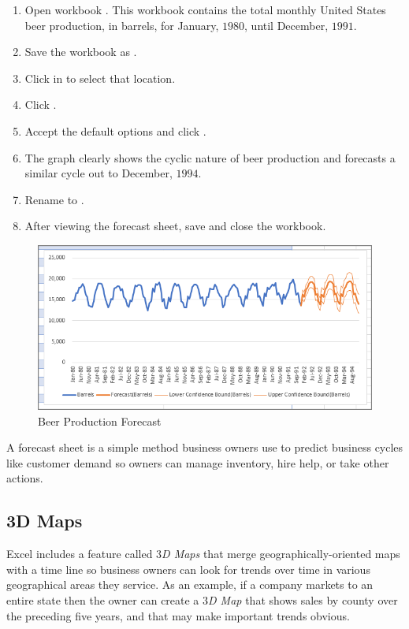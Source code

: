 \begin{enumerate}
	\item Open workbook . This workbook contains the total monthly United States beer production, in barrels, for January, $ 1980 $, until December, $ 1991 $. 
	\item Save the workbook as .
	\item Click in  to select that location.
	\item Click .
	\item Accept the default options and click .
	\item The graph clearly shows the cyclic nature of beer production and forecasts a similar cycle out to December, $ 1994 $.
	\item Rename  to .
	\item After viewing the forecast sheet, save and close the  workbook.
\end{enumerate}

\begin{figure}[H]
	\centering
	\includegraphics[width=\maxwidth{.95\linewidth}]{gfx/ch08_fig13}
	\caption{Beer Production Forecast}
	\label{08:fig13}
\end{figure}

A forecast sheet is a simple method business owners use to predict business cycles like customer demand so owners can manage inventory, hire help, or take other actions.

\subsection{3D Maps}

Excel includes a feature called \textit{$ 3 $D Maps} that merge geographically-oriented maps with a time line so business owners can look for trends over time in various geographical areas they service. As an example, if a company markets to an entire state then the owner can create a \textit{$ 3 $D Map} that shows sales by county over the preceding five years, and that may make important trends obvious.

